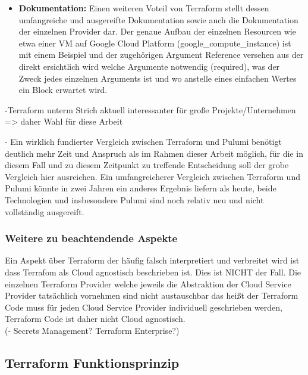 \begin{spacing}{1.2}
\begin{itemize}
  \item \textbf{Dokumentation:} Einen weiteren Voteil von Terraform stellt
  dessen umfangreiche und ausgereifte Dokumentation sowie auch die
  Dokumentation der einzelnen Provider dar. Der genaue Aufbau der einzelnen
  Resourcen wie etwa einer VM auf Google Cloud Platform
  (google\_compute\_instance) ist mit einem Beispiel und der zugehörigen
  Argument Reference versehen aus der direkt ersichtlich wird welche
  Argumente notwendig (required), was der Zweck jedes einzelnen Arguments ist
  und wo anstelle eines einfachen Wertes ein Block erwartet wird.

\end{itemize}

-Terraform unterm Strich aktuell interessanter für große Projekte/Unternehmen
=> daher Wahl für diese Arbeit

- Ein wirklich fundierter Vergleich zwischen Terraform und Pulumi benötigt
deutlich mehr Zeit und Anspruch als im Rahmen dieser Arbeit möglich, für
die in diesem Fall und zu diesem Zeitpunkt zu treffende Entscheidung soll
der grobe Vergleich hier ausreichen. Ein umfangreicherer Vergleich zwischen
Terraform und Pulumi könnte in zwei Jahren ein anderes Ergebnis liefern
als heute, beide Technologien und insbesondere Pulumi sind noch relativ neu
und nicht vollständig ausgereift.

\subsubsection{Weitere zu beachtendende Aspekte}

Ein Aspekt über Terraform der häufig falsch interpretiert und verbreitet wird
ist dass Terrafom als Cloud agnostisch beschrieben ist. Dies ist NICHT der
Fall. Die einzelnen Terraform Provider welche jeweils die Abstraktion der
Cloud Service Provider tatsächlich vornehmen sind nicht austauschbar das heißt
der Terraform Code muss für jeden Cloud Service Provider individuell
geschrieben werden, Terraform Code ist daher nicht Cloud agnostisch.\\

(- Secrets Management? Terraform Enterprise?)

\subsection{Terraform Funktionsprinzip}


\end{spacing}
